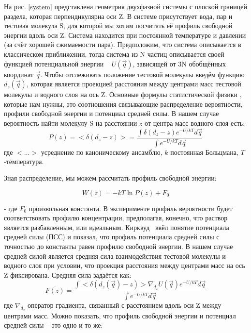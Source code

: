 На рис. \ref{system} представлена геометрия двухфазной системы с плоской границей раздела, которая перпендикулярна оси Z. В системе присутствует вода, пар и тестовая молекула S, для которой мы хотим посчитать её профиль свободной энергии вдоль оси Z.
Система находится при постоянной температуре и давлении (за счёт хорошей сжимаемости пара). Предположим, что система описывается в классическом приближении, тогда система из N частиц описывается своей функцией потенциальной энергии  ~\cite{landau_tm} $U(\vec{q})$, зависящей от 3N обобщённых координат  $\vec{q}$. Чтобы отслеживать положение тестовой молекулы введём функцию $d_{z}(\vec{q})$, которая является проекцией расстояния между центрами масс тестовой молекулы и водного слоя на ось Z.
Основные формулы статистической физики \cite{stat_mech_book_2000},  которые нам нужны, это соотношения связывающие распределение вероятности, профили свободной энергии и потенциал средней силы.
В нашем случае вероятность найти молекулу S на расстоянии $z$ от центра масс водного слоя есть:
\begin{equation}
P(z)=<\delta(d_{z}-z)>=\frac{\int{\delta(d_{z}-z)e^{-U/kT}d\vec{q}}}{\int{e^{-U/kT}d\vec{q}}}
\label{probab}
\end{equation}
где $<...>$ усреднение по каноническому ансамблю, $k$ постоянная Больцмана, $T$ -температура. 

Зная распределение, мы можем рассчитать профиль свободной энергии:

\begin{equation}
W(z)=-kT\ln{P(z)}+F_0
\label{fe_prof}
\end{equation}

- где $F_0$ произвольная константа. В эксперименте профиль вероятности будет соответствовать профилю концентрации, предполагая, конечно, что раствор является разбавленным, или идеальным. Кирквуд~\cite{kirkwood} ввёл понятие потенциала средней силы (ПСС) и показал, что профиль потенциала средней силы с точностью до константы равен профилю свободной энергии. В нашем случае средней силой является средняя сила взаимодействия тестовой молекулы и водного слоя при условии, что проекция расстояния между центрами масс на ось Z фиксирована. Средняя сила задаётся как:
\begin{equation}
\overline{F(z)}=\frac{
 \int{<\delta(d_{z}(\vec{q})-z)>\nabla_{d_z}U(\vec{q})e^{-U/kT}d\vec{q}}
}
{\int{e^{-U/kT}d\vec{q}}}
\label{mf}
\end{equation}
где $\nabla_{d_z}$ оператор градиента, связанный с расстоянием вдоль оси Z между центрами масс.
Можно показать, что профиль свободной энергии и потенциал средней силы -- это одно и то же:

